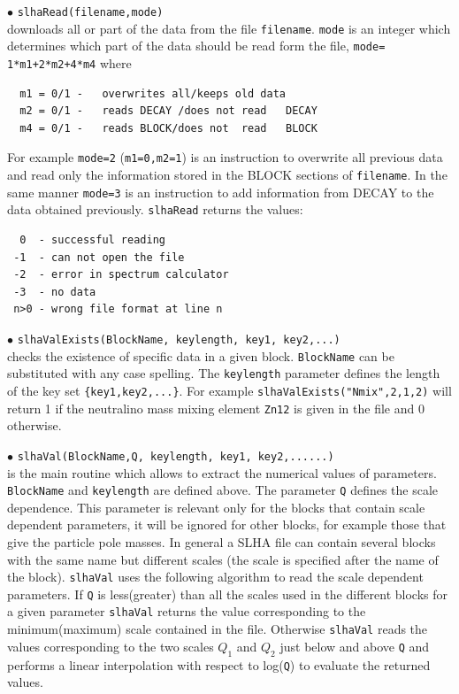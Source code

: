 \documentclass[12pt,a4paper]{article}
\begin{document}
\noindent
$\bullet$ \verb|slhaRead(filename,mode)|\\
downloads all or  part of the data  from the file \verb|filename|.
\verb|mode| is an integer which determines which part of the data should be read form the file, 
\verb|mode= 1*m1+2*m2+4*m4|  where
\begin{verbatim}
  m1 = 0/1 -   overwrites all/keeps old data                                                                                
  m2 = 0/1 -   reads DECAY /does not read   DECAY
  m4 = 0/1 -   reads BLOCK/does not  read   BLOCK
\end{verbatim}
For example \verb|mode=2| (\verb|m1=0,m2=1|) is an instruction to overwrite all previous data and 
read only the information stored in the BLOCK sections of
\verb|filename|. In the same manner \verb|mode=3| is an instruction to add information from DECAY 
to the data obtained previously. \verb|slhaRead| returns the values:
\begin{verbatim}
  0  - successful reading
 -1  - can not open the file
 -2  - error in spectrum calculator
 -3  - no data
 n>0 - wrong file format at line n
\end{verbatim}
%
\noindent
$\bullet$ \verb|slhaValExists(BlockName, keylength, key1, key2,...)|\\
checks the existence of specific data in a given block. 
\verb|BlockName| can  be substituted with any case spelling.
The \verb|keylength| parameter defines the length of the key set
\verb|{key1,key2,...}|. 
For example
     \verb|slhaValExists("Nmix",2,1,2)|
will return 1 if the neutralino mass mixing element \verb|Zn12| is given in the file and 
0 otherwise.

\noindent
$\bullet$ \verb|slhaVal(BlockName,Q, keylength, key1, key2,......)|\\
is the main routine which allows to  extract the  numerical values of parameters.
\verb|BlockName| and \verb|keylength| are defined above.
The parameter \verb|Q| defines  the scale dependence. 
This parameter is relevant only for the blocks that contain scale dependent parameters, it will be ignored for other
blocks, for example those that give the particle pole masses. 
In general a SLHA file can contain several blocks with 
the same name but different scales (the scale is specified after the name of the block).
\verb|slhaVal| uses the following algorithm to read the scale dependent parameters. 
If \verb|Q| is less(greater) than all the  scales used in the different blocks for a given parameter 
\verb|slhaVal| returns the value corresponding to the minimum(maximum) scale contained in the file.
Otherwise \verb|slhaVal| reads the values corresponding to the two scales $Q_1$ and $Q_2$ just below and above
\verb|Q| and performs a linear interpolation with respect to log(\verb|Q|) to evaluate the 
returned values.
\end{document}
